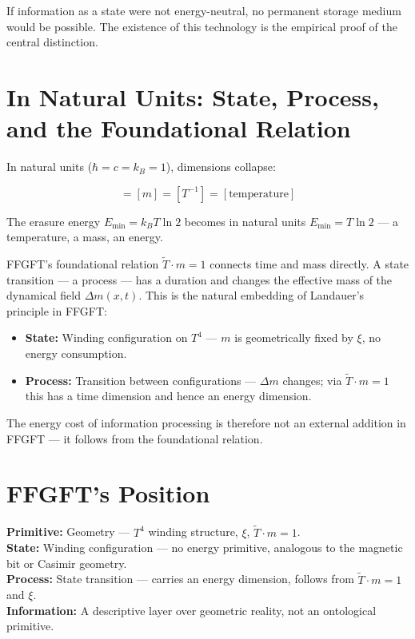If information as a state were not energy-neutral, no permanent storage
medium would be possible. The existence of this technology is the empirical
proof of the central distinction.

\section{In Natural Units: State, Process, and the Foundational Relation}

In natural units ($\hbar = c = k_B = 1$), dimensions collapse:

\begin{equation}
  [E] = [m] = [T^{-1}] = [\text{temperature}]
\end{equation}

The erasure energy $E_{\min} = k_B T \ln 2$ becomes in natural units
$E_{\min} = T \ln 2$ — a temperature, a mass, an energy.

FFGFT's foundational relation $\tilde{T} \cdot m = 1$ connects time and
mass directly. A state transition — a process — has a duration and changes
the effective mass of the dynamical field $\Delta m(x,t)$. This is the
natural embedding of Landauer's principle in FFGFT:

\begin{itemize}
  \item \textbf{State:} Winding configuration on $T^4$ — $m$ is
        geometrically fixed by $\xi$, no energy consumption.
  \item \textbf{Process:} Transition between configurations — $\Delta m$
        changes; via $\tilde{T} \cdot m = 1$ this has a time dimension
        and hence an energy dimension.
\end{itemize}

The energy cost of information processing is therefore not an external
addition in FFGFT — it follows from the foundational relation.

\section{FFGFT's Position}

\begin{keyresult}
\textbf{Primitive:} Geometry — $T^4$ winding structure, $\xi$,
$\tilde{T}\cdot m=1$.\\
\textbf{State:} Winding configuration — no energy primitive, analogous
to the magnetic bit or Casimir geometry.\\
\textbf{Process:} State transition — carries an energy dimension,
follows from $\tilde{T}\cdot m=1$ and $\xi$.\\
\textbf{Information:} A descriptive layer over geometric reality, not
an ontological primitive.
\end{keyresult}

